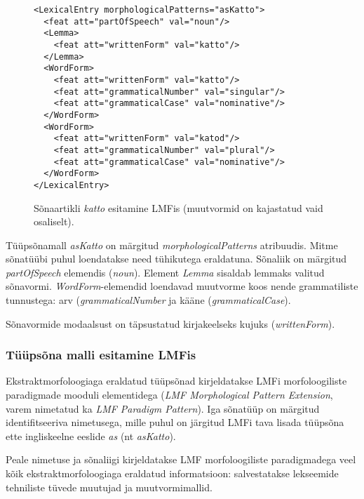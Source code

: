 \documentclass[12pt,a4paper]{article}
\begin{document}
\begin{figure}[h]
  \center
\begin{verbatim}
<LexicalEntry morphologicalPatterns="asKatto">
  <feat att="partOfSpeech" val="noun"/>
  <Lemma>
    <feat att="writtenForm" val="katto"/>
  </Lemma>
  <WordForm>
    <feat att="writtenForm" val="katto"/>
    <feat att="grammaticalNumber" val="singular"/>
    <feat att="grammaticalCase" val="nominative"/>
  </WordForm>
  <WordForm>
    <feat att="writtenForm" val="katod"/>
    <feat att="grammaticalNumber" val="plural"/>
    <feat att="grammaticalCase" val="nominative"/>
  </WordForm>
</LexicalEntry>
\end{verbatim}
\caption{Sõnaartikli \textit{katto} esitamine LMFis (muutvormid on kajastatud vaid osaliselt).
  \label{code:lmf-lexicalentry}}
\end{figure}

Tüüpsõnamall \textit{asKatto} on märgitud \textit{morphological\-Patterns} atribuudis. Mitme sõnatüübi puhul loendatakse need tühikutega eraldatuna. Sõnaliik on märgitud \textit{part\-Of\-Speech} elemendis (\textit{noun}). Element \textit{Lemma} sisaldab lemmaks valitud sõnavormi. \textit{Word\-Form}-elemendid loendavad muutvorme koos nende grammatiliste tunnustega: arv (\textit{grammatical\-Number} ja kääne (\textit{grammatical\-Case}).

Sõnavormide modaalsust on täpsustatud kirjakeelseks kujuks (\textit{writtenForm}).




\subsubsection{Tüüpsõna malli esitamine LMFis}

Ekstraktmorfoloogiaga eraldatud tüüpsõnad kirjeldatakse LMFi morfoloogiliste paradigmade mooduli elementidega (\textit{LMF Morphological Pattern Extension}, varem nimetatud ka \textit{LMF Paradigm Pattern}). Iga sõnatüüp on märgitud identifitseeriva nimetusega, mille puhul on järgitud LMFi tava lisada tüüpsõna ette ingliskeelne eeslide \textit{as} (nt \textit{asKatto}).

Peale nimetuse ja sõnaliigi kirjeldatakse LMF morfoloogiliste paradigmadega veel kõik ekstraktmorfoloogiaga eraldatud informatsioon: salvestatakse lekseemide tehniliste tüvede muutujad ja muutvormimallid.
\end{document}
